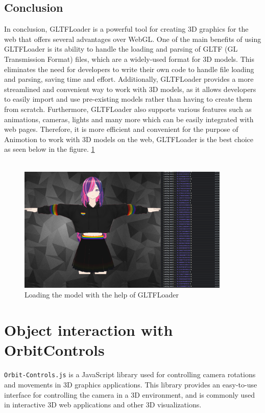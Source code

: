 \subsection{Conclusion}
In conclusion, GLTFLoader is a powerful tool for creating 3D graphics for the web that 
offers several advantages over WebGL. One of the main benefits of using GLTFLoader is 
its ability to handle the loading and parsing of GLTF (GL Transmission Format) files, 
which are a widely-used format for 3D models. This eliminates the need for developers 
to write their own code to handle file loading and parsing, saving time and effort. 
Additionally, GLTFLoader provides a more streamlined and convenient way to work with 
3D models, as it allows developers to easily import and use pre-existing models rather 
than having to create them from scratch. Furthermore, GLTFLoader also supports various 
features such as animations, cameras, lights and many more which can be easily integrated 
with web pages. Therefore, it is more efficient and convenient for the purpose of Animotion 
to work with 3D models on the web, GLTFLoader is the best choice as seen below in the figure. \ref{fig:gltfloader}
\\
\\
\begin{figure}[htb]
    \centering
    \includegraphics[width=0.9\textwidth]{pics/GLTFLoader.png}
    \caption{Loading the model with the help of GLTFLoader}
    \label{fig:gltfloader}
\end{figure}
\newpage
\section{Object interaction with OrbitControls}
\author{Romeo Bhuiyan}
\texttt{Orbit-Controls.js} is a JavaScript library used for controlling camera rotations 
and movements in 3D graphics applications. This library provides an easy-to-use 
interface for controlling the camera in a 3D environment, and is commonly used in 
interactive 3D web applications and other 3D visualizations.

